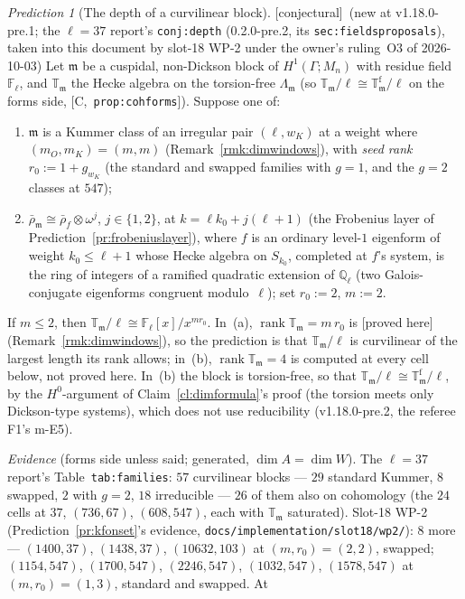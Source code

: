 \documentclass[11pt]{article}
\theoremstyle{remark}
\newtheorem{prediction}[theorem]{Prediction}
\newcommand{\F}{\mathbb{F}}
\newcommand{\Q}{\mathbb{Q}}
\newcommand{\Ga}{\Gamma}
\newcommand{\Fl}{\F_\ell}
\DeclareMathOperator{\rank}{rank}
\newcommand{\T}{\mathbb{T}}
\newcommand{\m}{\mathfrak{m}}
\newcommand{\Mn}{M_n}
\newcommand{\HA}[1]{[C,~\texttt{#1}]}      %
\newcommand{\PROVED}{\textsf{[proved here]}}
\newcommand{\CONJ}{\textsf{[conjectural]}}
\begin{document}
\begin{prediction}[The depth of a curvilinear block]\label{pr:depth}\CONJ\ (new at v1.18.0-pre.1; the $\ell=37$ report's \texttt{conj:depth} (0.2.0-pre.2, its \texttt{sec:fieldsproposals}),
taken into this document by slot-18 WP-2 under the owner's ruling~O3 of 2026-10-03)
Let $\m$ be a cuspidal, non-Dickson block of $H^1(\Ga;\Mn)$ with residue field~$\Fl$, and $\T_\m$ the Hecke algebra on the torsion-free $\Lambda_\m$ (so
$\T_\m/\ell\cong\T^{\mathrm f}_\m/\ell$ on the forms side, \HA{prop:cohforms}). Suppose one of:
\begin{enumerate}
\item[(a)] $\m$ is a Kummer class of an irregular pair $(\ell,w_K)$ at a weight where $(m_O,m_K)=(m,m)$ (Remark~\ref{rmk:dimwindows}), with \emph{seed rank}
  $r_0:=1+g_{w_K}$ (the standard and swapped families with $g=1$, and the $g=2$ classes at $547$);
\item[(b)] $\bar\rho_\m\cong\bar\rho_f\otimes\omega^{j}$, $j\in\{1,2\}$, at $k=\ell k_0+j(\ell+1)$ (the Frobenius layer of Prediction~\ref{pr:frobeniuslayer}), where
  $f$ is an ordinary level-$1$ eigenform of weight $k_0\le\ell+1$ whose Hecke algebra on $S_{k_0}$, completed at $f$'s system, is the ring of integers of a
  ramified quadratic extension of $\Q_\ell$ (two Galois-conjugate eigenforms congruent modulo~$\ell$); set $r_0:=2$, $m:=2$.
\end{enumerate}
If $m\le2$, then $\T_\m/\ell\cong\Fl[x]/x^{m r_0}$. In~(a), $\rank\T_\m=m\,r_0$ is \PROVED{} (Remark~\ref{rmk:dimwindows}), so the prediction is that
$\T_\m/\ell$ is curvilinear of the largest length its rank allows; in~(b), $\rank\T_\m=4$ is computed at every cell below, not proved here. In~(b) the
block is torsion-free, so that $\T_\m/\ell\cong\T^{\mathrm f}_\m/\ell$, by the $H^0$-argument of Claim~\ref{cl:dimformula}'s proof (the torsion meets only Dickson-type
systems), which does not use reducibility (v1.18.0-pre.2, the referee F1's m-E5).
\end{prediction}
\noindent\emph{Evidence} (forms side unless said; generated, $\dim A=\dim W$). The $\ell=37$ report's Table~\texttt{tab:families}: $57$ curvilinear blocks ---
$29$ standard Kummer, $8$ swapped, $2$ with $g=2$, $18$ irreducible --- $26$ of them also on cohomology (the $24$ cells at $37$, $(736,67)$, $(608,547)$, each with
$\T_\m$ saturated). Slot-18 WP-2 (Prediction~\ref{pr:kfonset}'s evidence, \texttt{docs/implementation/slot18/wp2/}): $8$ more --- $(1400,37)$, $(1438,37)$,
$(10632,103)$ at $(m,r_0)=(2,2)$, swapped; $(1154,547)$, $(1700,547)$, $(2246,547)$, $(1032,547)$, $(1578,547)$ at $(m,r_0)=(1,3)$, standard and swapped. At
\end{document}
